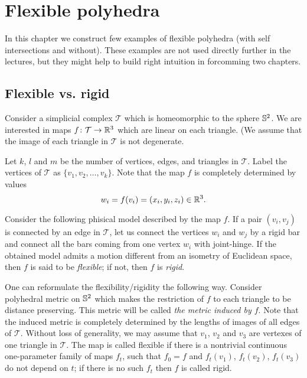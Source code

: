 \chapter{Flexible polyhedra}\label{chap:flex}



In this chapter we construct few examples of flexible polyhedra (with self intersections and without).
These examples are not used directly further in the lectures, 
but they might help to build right intuition in forcomming two chapters.


\section{Flexible vs. rigid}

Consider a simplicial complex $\mathcal{T}$ which is homeomorphic to the sphere $\mathbb{S}^2$.
We are interested in maps $f\colon\mathcal{T}\to\mathbb{R}^3$ which are linear on each triangle.
(We assume that the image of each triangle in $\mathcal{T}$ is not degenerate.

Let $k$, $l$ and $m$  be the number of vertices, edges, and triangles 
in $\mathcal{T}$.
Label the vertices of $\mathcal{T}$ as $\{v_1,v_2,\dots,v_k\}$.
Note that the map $f$ is completely determined by values 
$$w_i=f(v_i)=(x_i,y_i,z_i)\in\mathbb{R}^3.$$

Consider the following phisical model described by the map $f$.
If a pair $(v_i,v_j)$ is connected by an edge in $\mathcal{T}$,
let us connect the vertices $w_i$ and $w_j$ by a rigid bar 
and connect all the bars coming from one vertex $w_i$ with joint-hinge.
If the obtained model admits a motion different from an isometry of Euclidean space,
then $f$ is said to be \emph{flexible};
if not, then $f$ is \emph{rigid}.

One can reformulate the flexibility/rigidity the following way.
Consider polyhedral metric on $\mathbb{S}^2$ which makes the restriction of $f$
to each triangle to be distance preserving.
This metric will be called \textit{the metric induced by $f$}.
Note that the induced metric is completely determined by the lengths of images of all edges of $\mathcal{T}$.
Without loss of generality, we may assume that $v_1$, $v_2$ and $v_3$ 
are vertexes of one triangle in $\mathcal{T}$.
The map is called flexible if there is a nontrivial continuous one-parameter family of maps $f_t$,
such that $f_0=f$ and $f_t(v_1)$, $f_t(v_2)$, $f_t(v_3)$ do not depend on $t$;
if there is no such $f_t$
then $f$ is called rigid.

